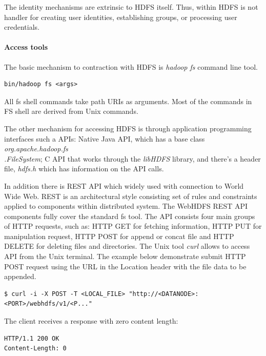 \documentclass[a4paper,12pt,oneside]{report}
\begin{document}
The identity mechanisms are  extrinsic to HDFS itself. Thus, within HDFS is not handler for creating user identities, establishing groups, or processing user credentials.

\paragraph{Access tools}
The basic mechanism to contraction with HDFS is \textit{hadoop fs}  command line tool. 
\begin{footnotesize}
\begin{lstlisting}[style=mybash]
bin/hadoop fs <args>
\end{lstlisting}
\end{footnotesize}
All fs shell commands take path URIs as arguments. Most of the commands in FS shell are derived from Unix commands. 

The other mechanism for accessing HDFS is through application programming interfaces such a APIs: Native Java API, which has a base class \textit{org.apache.hadoop.fs\\.FileSystem}; C API that works through the \textit{libHDFS} library, and there's a header file, \textit{hdfs.h} which has information on the API calls.

In addition there is REST API which widely used with connection to World Wide Web. REST is an architectural style consisting set of rules and constraints applied to components within distributed system. The WebHDFS REST API components fully cover the standard fs tool. The API consists four main groups of HTTP requests, such as: HTTP GET for fetching information, HTTP PUT for manipulation request, HTTP POST for append or concat file and HTTP DELETE for deleting files and directories.\cite{rest_api}
The Unix tool \textit{curl}  allows to access API from the Unix terminal. The example below demonstrate submit  HTTP POST request using the URL in the Location header with the file data to be appended.
\begin{footnotesize}
\begin{lstlisting}[style=mybash]
$ curl -i -X POST -T <LOCAL_FILE> "http://<DATANODE>:<PORT>/webhdfs/v1/<P..."
\end{lstlisting}
\end{footnotesize}
The client receives a response with zero content length:
\begin{footnotesize}
\begin{lstlisting}[style=mybash]
HTTP/1.1 200 OK
Content-Length: 0
\end{lstlisting}
\end{footnotesize}
\end{document}

